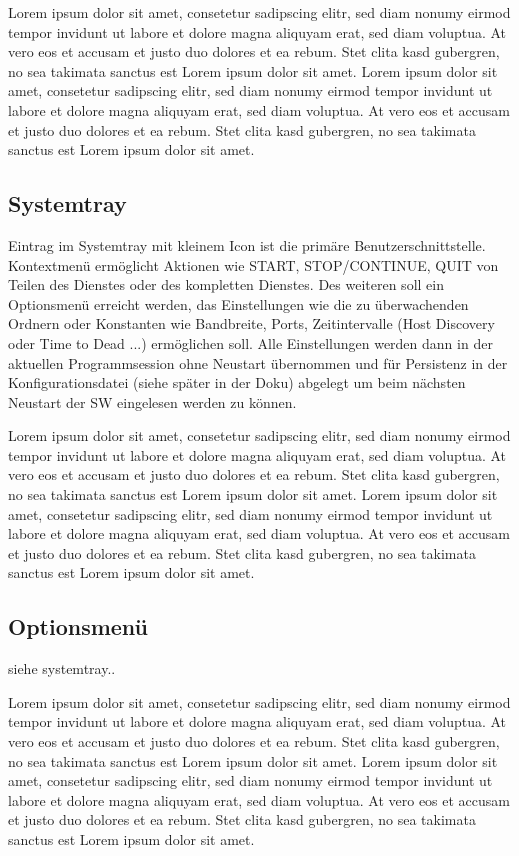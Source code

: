 \documentclass[12pt,oneside,a4paper,bibtotoc,liststotoc,pointlessnumbers]{scrartcl}
\begin{document}
\vspace{12px}
Lorem ipsum dolor sit amet, consetetur sadipscing elitr, sed diam nonumy eirmod tempor invidunt ut labore et dolore magna aliquyam erat, sed diam voluptua. At vero eos et accusam et justo duo dolores et ea rebum. Stet clita kasd gubergren, no sea takimata sanctus est Lorem ipsum dolor sit amet. Lorem ipsum dolor sit amet, consetetur sadipscing elitr, sed diam nonumy eirmod tempor invidunt ut labore et dolore magna aliquyam erat, sed diam voluptua. At vero eos et accusam et justo duo dolores et ea rebum. Stet clita kasd gubergren, no sea takimata sanctus est Lorem ipsum dolor sit amet.
\subsection{Systemtray}
Eintrag im Systemtray mit kleinem Icon ist die primäre Benutzerschnittstelle. Kontextmenü ermöglicht Aktionen wie START, STOP/CONTINUE, QUIT von Teilen des Dienstes oder des kompletten Dienstes. Des weiteren soll ein Optionsmenü erreicht werden, das Einstellungen wie die zu überwachenden Ordnern oder Konstanten wie Bandbreite, Ports, Zeitintervalle (Host Discovery oder Time to Dead ...) ermöglichen soll. Alle Einstellungen werden dann in der aktuellen Programmsession ohne Neustart übernommen und für Persistenz in der Konfigurationsdatei (siehe später in der Doku) abgelegt um beim nächsten Neustart der SW eingelesen werden zu können.

\vspace{12px}
Lorem ipsum dolor sit amet, consetetur sadipscing elitr, sed diam nonumy eirmod tempor invidunt ut labore et dolore magna aliquyam erat, sed diam voluptua. At vero eos et accusam et justo duo dolores et ea rebum. Stet clita kasd gubergren, no sea takimata sanctus est Lorem ipsum dolor sit amet. Lorem ipsum dolor sit amet, consetetur sadipscing elitr, sed diam nonumy eirmod tempor invidunt ut labore et dolore magna aliquyam erat, sed diam voluptua. At vero eos et accusam et justo duo dolores et ea rebum. Stet clita kasd gubergren, no sea takimata sanctus est Lorem ipsum dolor sit amet.
\subsection{Optionsmenü}
siehe systemtray..

\vspace{12px}
Lorem ipsum dolor sit amet, consetetur sadipscing elitr, sed diam nonumy eirmod tempor invidunt ut labore et dolore magna aliquyam erat, sed diam voluptua. At vero eos et accusam et justo duo dolores et ea rebum. Stet clita kasd gubergren, no sea takimata sanctus est Lorem ipsum dolor sit amet. Lorem ipsum dolor sit amet, consetetur sadipscing elitr, sed diam nonumy eirmod tempor invidunt ut labore et dolore magna aliquyam erat, sed diam voluptua. At vero eos et accusam et justo duo dolores et ea rebum. Stet clita kasd gubergren, no sea takimata sanctus est Lorem ipsum dolor sit amet.
\end{document}
